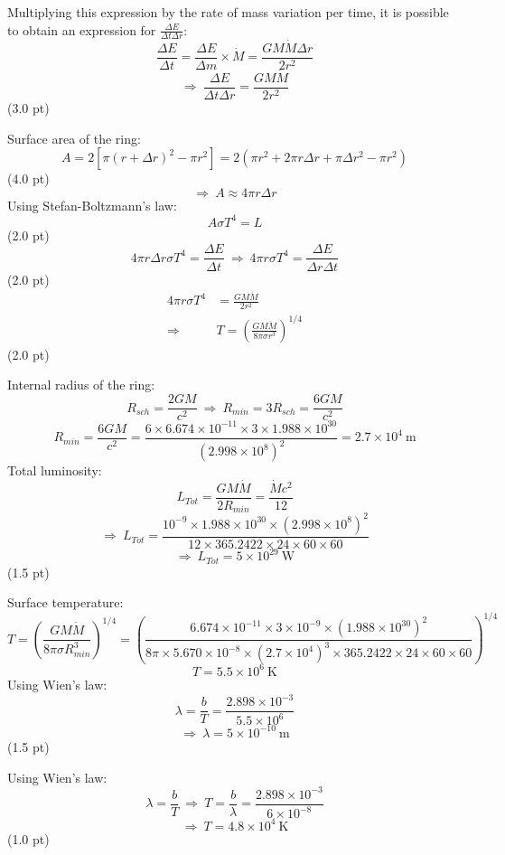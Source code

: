 \begin{description}
  Multiplying this expression by the rate of mass variation per time, it is
  possible to obtain an expression for $\frac{\Delta E}{\Delta t\Delta r}$:
  \[ \frac{\Delta E}{\Delta t} = \frac{\Delta E}{\Delta m}\times\dot{M}
     = \frac{GM\dot{M}\Delta r}{2r^2} \]
  \[ \Rightarrow\ \boxed{\frac{\Delta E}{\Delta t\Delta r}
     = \frac{GM\dot{M}}{2r^2}} \]
  \hfill(3.0 pt)
\item[(d)] Surface area of the ring:
  \[ A = 2\left[\pi(r + \Delta r)^2 - \pi r^2\right]
     = 2(\pi r^2 + 2\pi r\Delta r + \pi\Delta r^2 - \pi r^2) \]
  \hfill(4.0 pt)
  \[ \Rightarrow\ A \approx 4\pi r\Delta r \]
  Using Stefan-Boltzmann's law:
  \[ A\sigma T^4 = L \]
  \hfill(2.0 pt)
  \[ 4\pi r\Delta r\sigma T^4 = \frac{\Delta E}{\Delta t}
     \ \Rightarrow\ 4\pi r\sigma T^4 = \frac{\Delta E}{\Delta r\Delta t} \]
  \hfill(2.0 pt)
  \begin{align*}
    4\pi r\sigma T^4 &= \frac{GM\dot{M}}{2r^2}\\
    \Rightarrow\ &\boxed{T = \left(\frac{GM\dot{M}}
      {8\pi\sigma r^3}\right)^{1/4}}
  \end{align*}
  \hfill(2.0 pt)
\item[(e)] Internal radius of the ring:
  \[ R_{sch} = \frac{2GM}{c^2}
     \ \Rightarrow\ R_{min} = 3R_{sch} = \frac{6GM}{c^2} \]
  \[ R_{min} = \frac{6GM}{c^2}
     = \frac{6\times 6.674\times10^{-11}\times 3\times 1.988\times10^{30}}
            {(2.998\times10^8)^2}
     = 2.7\times10^4\ \mathrm{m} \]
  Total luminosity:
  \[ L_{Tot} = \frac{GM\dot{M}}{2R_{min}} = \frac{\dot{M}c^2}{12} \]
  \[ \Rightarrow\ L_{Tot}
     = \frac{10^{-9}\times 1.988\times10^{30}\times(2.998\times10^8)^2}
            {12\times 365.2422\times 24\times 60\times 60} \]
  \[ \Rightarrow\ \boxed{L_{Tot} = 5\times10^{29}\ \mathrm{W}} \]
  \hfill(1.5 pt)

  Surface temperature:
  \[ T = \left(\frac{GM\dot{M}}{8\pi\sigma R_{min}^3}\right)^{1/4}
     = \left(\frac{6.674\times10^{-11}\times 3\times10^{-9}\times
       (1.988\times10^{30})^2}
       {8\pi\times 5.670\times10^{-8}\times(2.7\times10^4)^3\times
       365.2422\times 24\times 60\times 60}\right)^{1/4} \]
  \[ T = 5.5\times10^6\ \mathrm{K} \]
  Using Wien's law:
  \[ \lambda = \frac{b}{T} = \frac{2.898\times10^{-3}}{5.5\times10^6} \]
  \[ \Rightarrow\ \boxed{\lambda = 5\times10^{-10}\ \mathrm{m}} \]
  \hfill(1.5 pt)
\item[(f)] Using Wien's law:
  \[ \lambda = \frac{b}{T}
     \ \Rightarrow\ T = \frac{b}{\lambda}
     = \frac{2.898\times10^{-3}}{6\times10^{-8}} \]
  \[ \Rightarrow\ T = 4.8\times10^4\ \mathrm{K} \]
  \hfill(1.0 pt)


\end{description}
